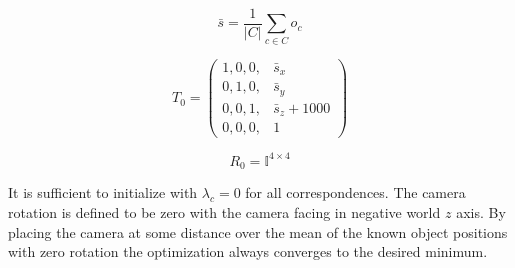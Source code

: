 \begin{equation}
  \bar{s} = \frac{1}{\left\lvert C \right\rvert } \sum_{c \in C} o_c 
\end{equation}

\begin{equation}
  T_0 = \begin{pmatrix}
    1, 0, 0,& \bar{s}_x \\   
    0, 1, 0,& \bar{s}_y \\   
    0, 0, 1,& \bar{s}_z + 1000 \\   
    0, 0, 0,& 1   
  \end{pmatrix}
\end{equation}

\begin{equation}
  R_0 = \mathbb{I} ^ {4 \times 4}
\end{equation}

It is sufficient to initialize with $\lambda_c = 0$ for all correspondences.
The camera rotation is defined to be zero with the camera facing in negative world $z$ axis.
By placing the camera at some distance over the mean of the known object positions with zero rotation the optimization always converges to the desired minimum.

